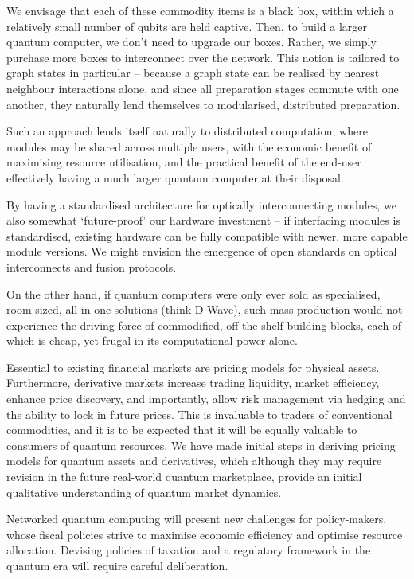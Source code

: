 We envisage that each of these commodity items is a black box, within which a relatively small number of qubits are held captive. Then, to build a larger quantum computer, we don't need to upgrade our boxes. Rather, we simply purchase more boxes to interconnect over the network. This notion is tailored to graph states in particular -- because a graph state can be realised by nearest neighbour interactions alone, and since all preparation stages commute with one another, they naturally lend themselves to modularised, distributed preparation.

Such an approach lends itself naturally to distributed computation, where modules may be shared across multiple users, with the economic benefit of maximising resource utilisation, and the practical benefit of the end-user effectively having a much larger quantum computer at their disposal.

By having a standardised architecture for optically interconnecting modules, we also somewhat `future-proof' our hardware investment -- if interfacing modules is standardised, existing hardware can be fully compatible with newer, more capable module versions. We might envision the emergence of open standards on optical interconnects and fusion protocols.

On the other hand, if quantum computers were only ever sold as specialised, room-sized, all-in-one solutions (think D-Wave\texttrademark), such mass production would not experience the driving force of commodified, off-the-shelf building blocks, each of which is cheap, yet frugal in its computational power alone.

Essential to existing financial markets are pricing models for physical assets. Furthermore, derivative markets increase trading liquidity, market efficiency, enhance price discovery, and importantly, allow risk management via hedging and the ability to lock in future prices. This is invaluable to traders of conventional commodities, and it is to be expected that it will be equally valuable to consumers of quantum resources. We have made initial steps in deriving pricing models for quantum assets and derivatives, which although they may require revision in the future real-world quantum marketplace, provide an initial qualitative understanding of quantum market dynamics.

Networked quantum computing will present new challenges for policy-makers, whose fiscal policies strive to maximise economic efficiency and optimise resource allocation. Devising policies of taxation and a regulatory framework in the quantum era will require careful deliberation.

